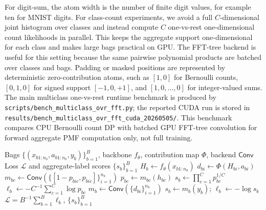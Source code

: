 For digit-sum, the atom width is the number of finite digit values, for example ten for MNIST digits.
For class-count experiments, we avoid a full $C$-dimensional joint histogram over classes and instead compute $C$ one-vs-rest one-dimensional count likelihoods in parallel.
This keeps the aggregate support one-dimensional for each class and makes large bags practical on GPU.
The FFT-tree backend is useful for this setting because the same pairwise polynomial products are batched over classes and bags.
Padding or masked positions are represented by deterministic zero-contribution atoms, such as $[1,0]$ for Bernoulli counts, $[0,1,0]$ for signed support $[-1,0,+1]$, and $[1,0,\ldots,0]$ for integer-valued sums.
The main multiclass one-vs-rest runtime benchmark is produced by \texttt{scripts/bench\_multiclass\_ovr\_fft.py}; the reported CUDA run is stored in \texttt{results/bench\_multiclass\_ovr\_fft\_cuda\_20260505/}.
This benchmark compares CPU Bernoulli count DP with batched GPU FFT-tree convolution for forward aggregate PMF computation only, not full training.

\begin{algorithm}[t]
\caption{Convolutional aggregate prediction for one minibatch}
\label{alg:bag-prediction}
\begin{algorithmic}[1]
\Require Bags $\{(x_{b1:n_b}, a_{b1:n_b}, y_b)\}_{b=1}^B$, backbone $f_\theta$, contribution map $\Phi$, backend $\mathsf{Conv}$
\Ensure Loss $\mathcal{L}$ and aggregate-label scores $\{s_b\}_{b=1}^B$
  \State $H_b \gets f_\theta(x_{b1:n_b})$
    \State $d_{bi} \gets \Phi(H_{bi}, a_{bi})$
  \EndFor
      \State $m_{bc} \gets \mathsf{Conv}(\{[1-p_{bic},p_{bic}]\}_{i=1}^{n_b})$
      \State $p_{bc} \gets m_{bc}(h_{bc})$
    \EndFor
    \State $s_b \gets \prod_{c=1}^C p_{bc}^{1/C}$ 
    \State $\ell_b \gets -C^{-1}\sum_{c=1}^C \log p_{bc}$
  \Else
    \State $m_b \gets \mathsf{Conv}(\{d_{bi}\}_{i=1}^{n_b})$
    \State $s_b \gets m_b(y_b)$; $\ell_b \gets -\log s_b$
  \EndIf
\EndFor
\State \Return $\mathcal{L}=B^{-1}\sum_{b=1}^B \ell_b$, $\{s_b\}_{b=1}^B$
\end{algorithmic}
\end{algorithm}

